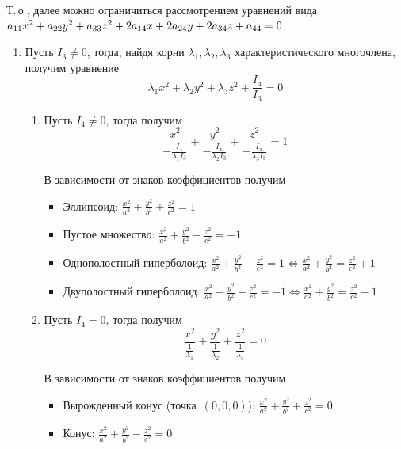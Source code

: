 Т.\,о., далее можно ограничиться рассмотрением уравнений вида $a_{11} x^2 + a_{22} y^2 + a_{33} z^2 + 2 a_{14} x + 2 a_{24} y + 2 a_{34} z \opbr+ a_{44} = 0$.
\begin{enumerate}
	\item Пусть $I_3 \neq 0$, тогда, найдя корни $\lambda_1, \lambda_2, \lambda_3$ характеристического многочлена, получим уравнение
	\begin{equation*}
	\lambda_1 x^2 + \lambda_2 y^2 + \lambda_3 z^2 + \frac{I_4}{I_3} = 0
	\end{equation*}
	\begin{enumerate}
		\item Пусть $I_4 \neq 0$, тогда получим
		\begin{equation*}
		\frac{x^2}{-\frac{I_4}{\lambda_1 I_3}} + \frac{y^2}{-\frac{I_4}{\lambda_2 I_3}} + \frac{z^2}{-\frac{I_4}{\lambda_3 I_3}} = 1
		\end{equation*}
		
		В зависимости от знаков коэффициентов получим
		\begin{itemize}
			\item Эллипсоид:
			$\displaystyle \frac{x^2}{a^2} + \frac{y^2}{b^2} + \frac{z^2}{c^2} = 1$
			\item Пустое множество:
			$\displaystyle \frac{x^2}{a^2} + \frac{y^2}{b^2} + \frac{z^2}{c^2} = -1$
			\item Однополостный гиперболоид:
			$\displaystyle \frac{x^2}{a^2} + \frac{y^2}{b^2} - \frac{z^2}{c^2} = 1 \Leftrightarrow
			\frac{x^2}{a^2} + \frac{y^2}{b^2} = \frac{z^2}{c^2} + 1$
			\item Двуполостный гиперболоид:
			$\displaystyle \frac{x^2}{a^2} + \frac{y^2}{b^2} - \frac{z^2}{c^2} = -1 \Leftrightarrow
			\frac{x^2}{a^2} + \frac{y^2}{b^2} = \frac{z^2}{c^2} - 1$
		\end{itemize}
		
		\item Пусть $I_4 = 0$, тогда получим
		\begin{equation*}
		\frac{x^2}{\frac1{\lambda_1}} + \frac{y^2}{\frac1{\lambda_2}} + \frac{z^2}{\frac1{\lambda_3}} = 0
		\end{equation*}
		
		В зависимости от знаков коэффициентов получим
		\begin{itemize}
			\item Вырожденный конус (точка~$(0, 0, 0)$):
			$\displaystyle \frac{x^2}{a^2} + \frac{y^2}{b^2} + \frac{z^2}{c^2} = 0$
			\item Конус:
			$\displaystyle \frac{x^2}{a^2} + \frac{y^2}{b^2} - \frac{z^2}{c^2} = 0$
		\end{itemize}
	\end{enumerate}
	

\end{enumerate}

